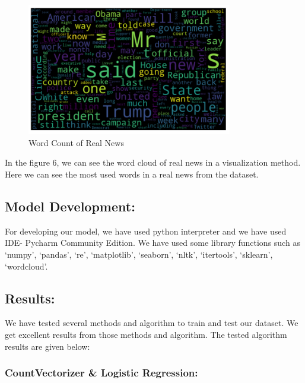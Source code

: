 \documentclass{article}
\begin{document}
    \break
    \begin{figure}[!h]
    \centering
    \includegraphics[width=0.8\textwidth]{image6.png}
    \caption{Word Count of Real News}
    \label{fig:label}
    \end{figure}\break
    In the figure 6, we can see the word cloud of real news in a visualization method.  Here we can see the most used words in a real news from the dataset.
    \break
    
    
    \subsection{Model Development:}
   For developing our model, we have used python interpreter and we have used IDE- Pycharm Community Edition. We have used some library functions such as ‘numpy’, ‘pandas’, ‘re’, ‘matplotlib’, ‘seaborn’, ‘nltk’, ‘itertools’, ‘sklearn’, ‘wordcloud’.
    
    
    \subsection{Results:}
    We have tested several methods and algorithm to train and test our dataset. We get excellent results from those methods and algorithm. The tested algorithm results are given below:
        \subsubsection{CountVectorizer \& Logistic Regression:}
    
\end{document}
